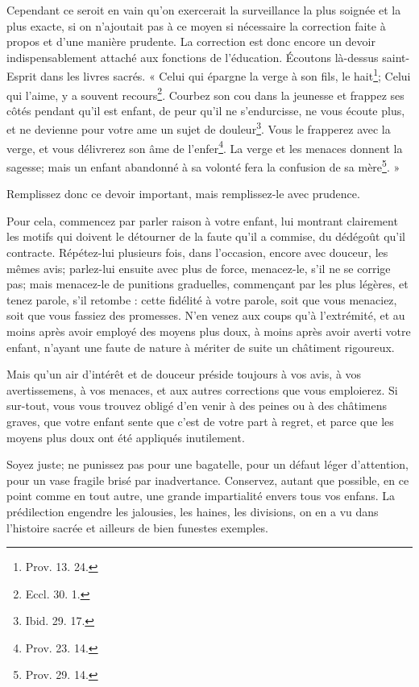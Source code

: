 \documentclass[instructions.tex]{subfiles}
\begin{document}
Cependant ce seroit en vain qu’on exercerait la surveillance la plus soignée et la plus exacte, si on n’ajoutait pas à ce moyen si nécessaire la correction faite à propos et d’une manière prudente. La correction est donc encore un devoir indispensablement attaché aux fonctions de l’éducation. Écoutons là-dessus saint-Esprit dans les livres sacrés. « Celui qui épargne la verge à son fils, le hait\footnote{Prov. 13. 24.}; Celui qui l’aime, y a souvent recours\footnote{Eccl. 30. 1.}. Courbez son cou dans la jeunesse et frappez ses côtés pendant qu’il est enfant, de peur qu’il ne s’endurcisse, ne vous écoute plus, et ne devienne pour votre ame un sujet de douleur\footnote{Ibid. 29. 17.}. Vous le frapperez avec la verge, et vous délivrerez son âme de l’enfer\footnote{Prov. 23. 14.}. La verge et les menaces donnent la sagesse; mais un enfant abandonné à sa volonté fera la confusion de sa mère\footnote{Prov. 29. 14.}. »
 
Remplissez donc ce devoir important, mais remplissez-le avec prudence.
 
Pour cela, commencez par parler raison à votre enfant, lui montrant clairement les motifs qui doivent le détourner de la faute qu’il a commise, du dédégoût qu’il contracte. Répétez-lui plusieurs fois, dans l’occasion, encore avec douceur, les mêmes avis; parlez-lui ensuite avec plus de force, menacez-le, s’il ne se corrige pas; mais menacez-le de punitions graduelles, commençant par les plus légères, et tenez parole, s’il retombe : cette fidélité à votre parole, soit que vous menaciez, soit que vous fassiez des promesses. N’en venez aux coups qu’à l’extrémité, et au moins après avoir employé des moyens plus doux, à moins après avoir averti votre enfant, n’ayant une faute de nature à mériter de suite un châtiment rigoureux.
 
Mais qu’un air d’intérêt et de douceur préside toujours à vos avis, à vos avertissemens, à vos menaces, et aux autres corrections que vous emploierez. Si sur-tout, vous vous trouvez obligé d’en venir à des peines ou à des châtimens graves, que votre enfant sente que c’est de votre part à regret, et parce que les moyens plus doux ont été appliqués inutilement.
 
Soyez juste; ne punissez pas pour une bagatelle, pour un défaut léger d’attention, pour un vase fragile brisé par inadvertance. Conservez, autant que possible, en ce point comme en tout autre, une grande impartialité envers tous vos enfans. La prédilection engendre les jalousies, les haines, les divisions, on en a vu dans l’histoire sacrée et ailleurs de bien funestes exemples.
 
\end{document}
